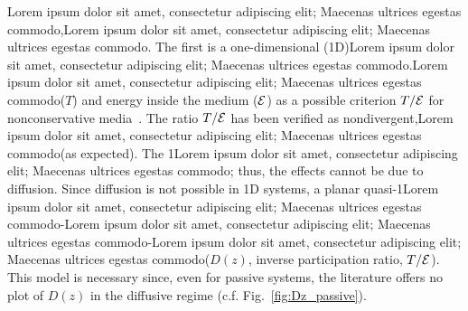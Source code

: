 Lorem ipsum dolor sit amet, consectetur adipiscing elit; Maecenas ultrices egestas commodo,Lorem ipsum dolor sit amet, consectetur adipiscing elit; Maecenas ultrices egestas commodo. The first is a one-dimensional (1D)Lorem ipsum dolor sit amet, consectetur adipiscing elit; Maecenas ultrices egestas commodo.Lorem ipsum dolor sit amet, consectetur adipiscing elit; Maecenas ultrices egestas commodo($T$) and energy inside the medium (${\cal E}$) as a possible criterion $T/{\cal E}$ for nonconservative media~\cite{2010_Payne_TE,2010_Payne_loc_criterion}. The ratio $T/{\cal E}$ has been verified as nondivergent,Lorem ipsum dolor sit amet, consectetur adipiscing elit; Maecenas ultrices egestas commodo(as expected). The 1Lorem ipsum dolor sit amet, consectetur adipiscing elit; Maecenas ultrices egestas commodo; thus, the effects cannot be due to diffusion.
Since diffusion is not possible in 1D systems, a planar quasi-1Lorem ipsum dolor sit amet, consectetur adipiscing elit; Maecenas ultrices egestas commodo-Lorem ipsum dolor sit amet, consectetur adipiscing elit; Maecenas ultrices egestas commodo-Lorem ipsum dolor sit amet, consectetur adipiscing elit; Maecenas ultrices egestas commodo($D(z)$, inverse participation ratio, $T/{\cal E}$). This model is necessary since, even for passive systems, the literature offers no plot of $D(z)$ in the diffusive regime (c.f. Fig.~\ref{fig:Dz_passive}).%

